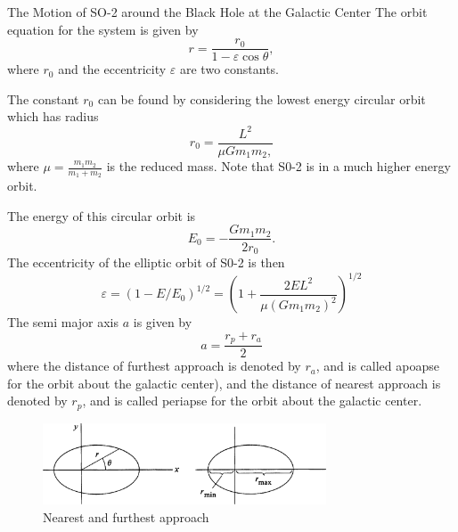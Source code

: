 \documentclass{esg8012pset}
\begin{document}
\begin{solution}
\begin{problem}{The Motion of SO-2 around the Black Hole at the Galactic Center}
    The orbit equation for the system is given by
    $$r = \frac{r_0}{1 - \varepsilon\cos\theta},$$
    where $r_0$ and the eccentricity $\varepsilon$ are two constants.

    The constant $r_0$ can be found by considering the lowest energy circular orbit which has radius
    $$r_0 = \frac{L^2}{\mu G m_1 m_2,}$$
    where $\mu = \frac{m_1 m_2}{m_1 + m_2}$ is the reduced mass. Note that S0-2 is in a much higher energy orbit.

    The energy of this circular orbit is
    $$E_0 = -\frac{G m_1 m_2}{2r_0}.$$
    The eccentricity of the elliptic orbit of S0-2 is then
    $$\varepsilon = (1 - E / E_0)^{1/2} = \left(1 + \frac{2 E L^2}{\mu(G m_1 m_2)^2}\right)^{1/2}$$
    The semi major axis $a$ is given by
    $$a = \frac{r_p + r_a}{2}$$
    where the distance of furthest approach is denoted by $r_a$, and is called apoapse for the orbit about the galactic center), and the distance of nearest approach is denoted by $r_p$, and is called periapse for the orbit about the galactic center.
    \begin{figure}[!h]
      \begin{center}\includegraphics[width=0.75\textwidth]{ps10_6}\end{center}
      \caption{Nearest and furthest approach}
    \end{figure}


\end{problem}
\end{solution}
\end{document}
